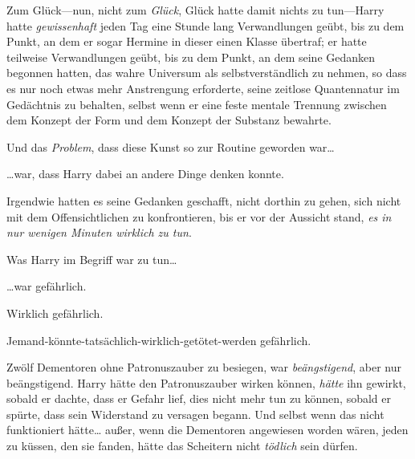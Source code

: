 Zum Glück—nun, nicht zum \emph{Glück}, Glück hatte damit nichts zu tun—Harry hatte \emph{gewissenhaft} jeden Tag eine Stunde lang Verwandlungen geübt, bis zu dem Punkt, an dem er sogar Hermine in dieser einen Klasse übertraf; er hatte teilweise Verwandlungen geübt, bis zu dem Punkt, an dem seine Gedanken begonnen hatten, das wahre Universum als selbstverständlich zu nehmen, so dass es nur noch etwas mehr Anstrengung erforderte, seine zeitlose Quantennatur im Gedächtnis zu behalten, selbst wenn er eine feste mentale Trennung zwischen dem Konzept der Form und dem Konzept der Substanz bewahrte.

Und das \emph{Problem}, dass diese Kunst so zur Routine geworden war…

…war, dass Harry dabei an andere Dinge denken konnte.

Irgendwie hatten es seine Gedanken geschafft, nicht dorthin zu gehen, sich nicht mit dem Offensichtlichen zu konfrontieren, bis er vor der Aussicht stand, \emph{es in nur wenigen Minuten wirklich zu tun}.

Was Harry im Begriff war zu tun…

…war gefährlich.

Wirklich gefährlich.

Jemand-könnte-tatsächlich-wirklich-getötet-werden gefährlich.

Zwölf Dementoren ohne Patronuszauber zu besiegen, war \emph{beängstigend}, aber nur beängstigend. Harry hätte den Patronuszauber wirken können, \emph{hätte} ihn gewirkt, sobald er dachte, dass er Gefahr lief, dies nicht mehr tun zu können, sobald er spürte, dass sein Widerstand zu versagen begann. Und selbst wenn das nicht funktioniert hätte… außer, wenn die Dementoren angewiesen worden wären, jeden zu küssen, den sie fanden, hätte das Scheitern nicht \emph{tödlich} sein dürfen.

